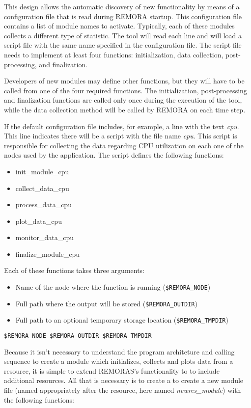 \documentclass[10pt,a4paper]{report}
\begin{document}
This design allows the automatic discovery of new functionality by means of a configuration
file that is read during REMORA startup. This configuration file contains
a list of module names to activate. Typically, each of these modules collects a 
different type of statistic. The tool will read each line and will load a
script file with the same name specified in the configuration file. The script file needs
to implement at least four functions: initialization, data collection, post-processing, and 
finalization.

Developers of new modules may define other functions,
but they will have to be called from one of the four required functions. The initialization,
post-processing and finalization functions are called only once during the execution of the
tool, while the data collection method will be called by REMORA on each time step.

If the default configuration file includes, for example, a line with the text \textit{cpu}.
This line indicates there will be a script with the file name \textit{cpu}. This script
is responsible for collecting the data regarding CPU utilization on each one of the
nodes used by the application. The script defines the following functions:

\begin{itemize}
	\item init\_module\_cpu
	\item collect\_data\_cpu
	\item process\_data\_cpu
	\item plot\_data\_cpu
	\item monitor\_data\_cpu
	\item finalize\_module\_cpu
\end{itemize}

Each of these functions takes three arguments: 

\begin{itemize}
\item Name of the node where the function is running      (\texttt{\$REMORA\_NODE})
\item Full path where the output will be stored           (\texttt{\$REMORA\_OUTDIR})
\item Full path to an optional temporary storage location (\texttt{\$REMORA\_TMPDIR})
\end{itemize}

\verb+$REMORA_NODE $REMORA_OUTDIR $REMORA_TMPDIR+

Because it isn't necessary to understand the program architeture and calling sequence 
to create a module which initializes, collects and plots data from a resource,
it is simple to extend REMORAS's functionality to
to  include additional resources.
All that is necessary is to create a
to create a new module file (named appropriately after the resource, here named \textit{newres\_module}) 
with the following functions:
\end{document}
